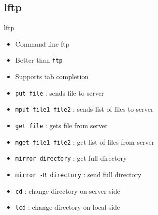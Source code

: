 \subsection{lftp}

\begin{frame}[fragile]{lftp}
  \begin{itemize}
    \pause \item Command line ftp
    \pause \item Better than \texttt{ftp}
    \pause \item Supports tab completion
    \pause \item \texttt{put file} : sends file to server
    \pause \item \texttt{mput file1 file2} : sends list of files to server
    \pause \item \texttt{get file} : gets file from server
    \pause \item \texttt{mget file1 file2} : get list of files from server
    \pause \item \texttt{mirror directory} : get full directory
    \pause \item \texttt{mirror -R directory} : send full directory
    \pause \item \texttt{cd} : change directory on server side
    \pause \item \texttt{lcd} : change directory on local side
  \end{itemize}
\end{frame}

